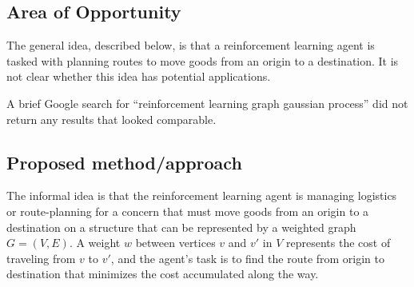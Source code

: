 \begin{figure}
    \label{fig:prop_graph}
\end{figure}


\subsection{Area of Opportunity}

The general idea, described below, is that a reinforcement learning agent is tasked with planning routes to move goods from an origin to a destination. It is not clear whether this idea has potential applications.

A brief Google search for ``reinforcement learning graph gaussian process'' did not return any results that looked comparable.

\subsection{Proposed method/approach}

The informal idea is that the reinforcement learning agent is managing logistics or route-planning for a concern that must move goods from an origin to a destination on a structure that can be represented by a weighted graph $G = (V, E)$. A weight $w$ between vertices $v$ and $v'$ in $V$ represents the cost of traveling from $v$ to $v'$, and the agent's task is to find the route from origin to destination that minimizes the cost accumulated along the way.

